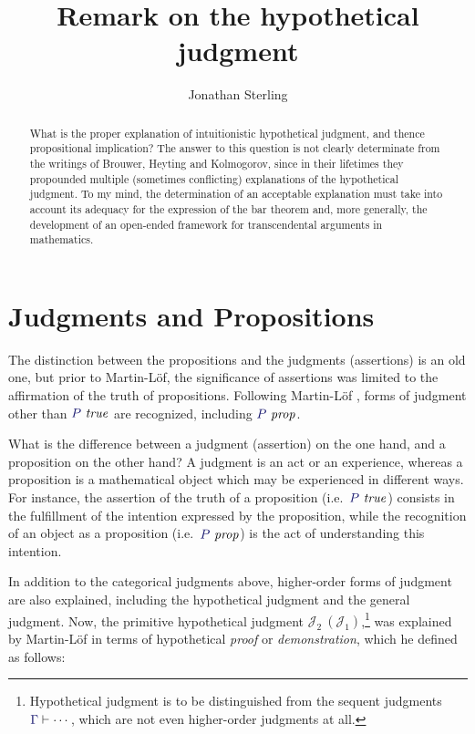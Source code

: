 \documentclass[11pt]{amsart}
\theoremstyle{definition}
\theoremstyle{remark}
\numberwithin{equation}{section}
\def\InputModeColorName{MidnightBlue}
\newcommand\InputMode[1]{{\color{\InputModeColorName}{#1}}}
\newcommand\HypJ[2]{#1\ (#2)}
\newcommand\JJ{\mathcal{J}}
\newcommand\IsTrue[1]{\InputMode{#1}\ \mathit{true}}
\newcommand\IsProp[1]{\InputMode{#1}\ \mathit{prop}}
\newcommand\Seq[2]{\InputMode{#1}\vdash #2}
\begin{document}
\title{Remark on the hypothetical judgment}

\author{Jonathan Sterling}
\address{}

\onehalfspacing

\begin{abstract}

What is the proper explanation of intuitionistic hypothetical judgment, and
thence propositional implication? The answer to this question is not clearly
determinate from the writings of Brouwer, Heyting and Kolmogorov, since in
their lifetimes they propounded multiple (sometimes conflicting) explanations
of the hypothetical judgment. To my mind, the determination of an acceptable
explanation must take into account its adequacy for the expression of the bar
theorem and, more generally, the development of an open-ended framework for
transcendental arguments in mathematics.

\end{abstract}

\maketitle

\section{Judgments and Propositions}

The distinction between the propositions and the judgments (assertions) is an
old one, but prior to Martin-L\"of, the significance of assertions was limited
to the affirmation of the truth of propositions. Following Martin-L\"of
\cite{siena.lectures}, forms of judgment other than $\IsTrue{P}$ are recognized,
including $\IsProp{P}$.

What is the difference between a judgment (assertion) on the one hand, and a
proposition on the other hand? A judgment is an act or an experience, whereas a
proposition is a mathematical object which may be experienced in different ways.
For instance, the assertion of the truth of a proposition (i.e.\ $\IsTrue{P}$)
consists in the fulfillment of the intention expressed by the proposition, while
the recognition of an object as a proposition (i.e.\ $\IsProp{P}$) is the act of
understanding this intention.

In addition to the categorical judgments above, higher-order forms of judgment
are also explained, including the hypothetical judgment and the general
judgment. Now, the primitive hypothetical judgment
$\HypJ{\JJ_2}{\JJ_1}$,\footnote{Hypothetical judgment is to be distinguished
from the sequent judgments $\Seq{\Gamma}{\cdots}$, which are not even
higher-order judgments at all.} was explained by Martin-L\"of in terms of
hypothetical \emph{proof} or \emph{demonstration}, which he defined as follows:
\end{document}
